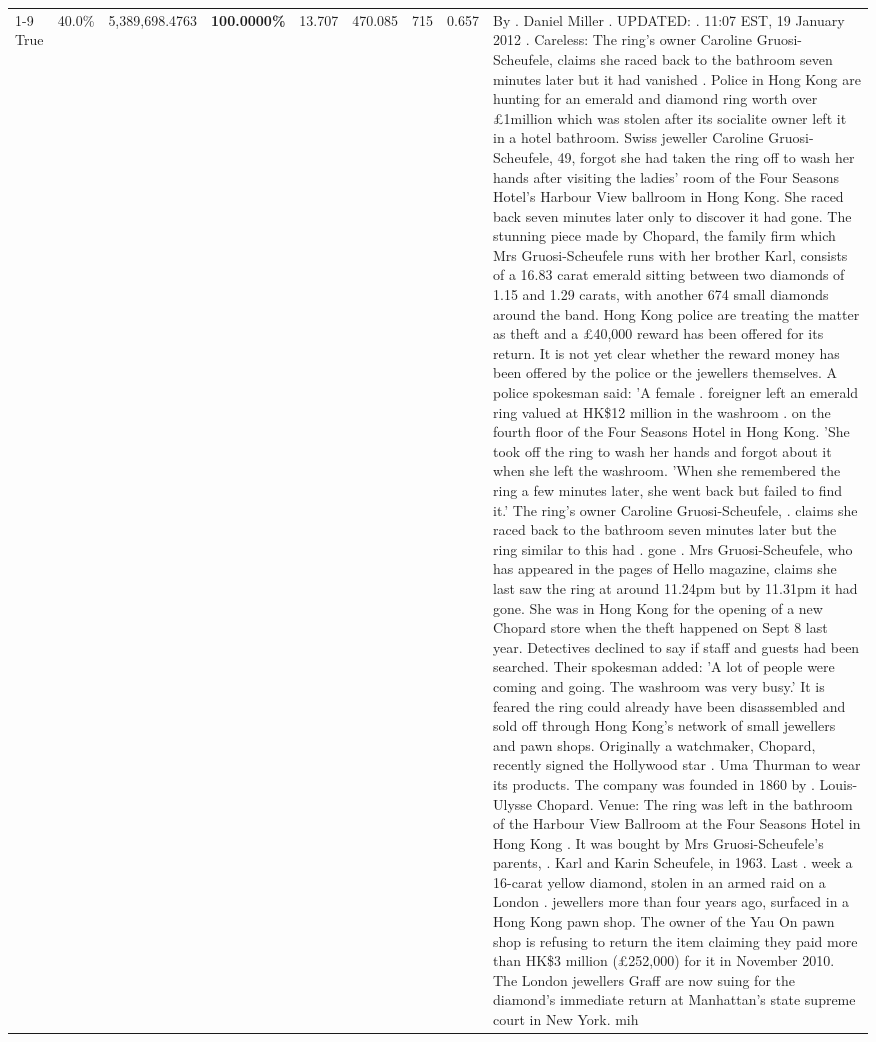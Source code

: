 \begin{table}[H]
\begin{tabular}{lllrlllll}
\cline{1-9}
True & 40.0\% & 5,389,698.4763 & \bfseries \color{red} 100.0000\% & 13.707 & 470.085 & 715 & 0.657 & By . Daniel Miller . UPDATED: . 11:07 EST, 19 January 2012 . Careless: The ring's owner Caroline Gruosi-Scheufele, claims she raced back to the bathroom seven minutes later but it had vanished . Police in Hong Kong are hunting for an emerald and diamond ring worth over £1million which was stolen after its socialite owner left it in a hotel bathroom. Swiss jeweller Caroline Gruosi-Scheufele, 49, forgot she had taken the ring off to wash her hands after visiting the ladies' room of the Four Seasons Hotel's Harbour View ballroom in Hong Kong. She raced back seven minutes later only to discover it had gone. The stunning piece made by Chopard, the family firm which Mrs Gruosi-Scheufele runs with her brother Karl, consists of a 16.83 carat emerald sitting between two diamonds of 1.15 and 1.29 carats, with another 674 small diamonds around the band. Hong Kong police are treating the matter as theft and a £40,000 reward has been offered for its return. It is not yet clear whether the reward money has been offered by the police or the jewellers themselves. A police spokesman said: 'A female . foreigner left an emerald ring valued at HK\$12 million in the washroom . on the fourth floor of the Four Seasons Hotel in Hong Kong. 'She took off the ring to wash her hands and forgot about it when she left the washroom. 'When she remembered the ring a few minutes later, she went back but failed to find it.' The ring's owner Caroline Gruosi-Scheufele, . claims she raced back to the bathroom seven minutes later but the ring similar to this had . gone . Mrs Gruosi-Scheufele, who has appeared in the pages of Hello magazine, claims she last saw the ring at around 11.24pm but by 11.31pm it had gone. She was in Hong Kong for the opening of a new Chopard store when the theft happened on Sept 8 last year. Detectives declined to say if staff and guests had been searched. Their spokesman added: 'A lot of people were coming and going. The washroom was very busy.' It is feared the ring could already have been disassembled and sold off through Hong Kong's network of small jewellers and pawn shops. Originally a watchmaker, Chopard, recently signed the Hollywood star . Uma Thurman to wear its products. The company was founded in 1860 by . Louis-Ulysse Chopard. Venue: The ring was left in the bathroom of the Harbour View Ballroom at the Four Seasons Hotel in Hong Kong . It was bought by Mrs Gruosi-Scheufele's  parents, . Karl and Karin Scheufele, in 1963. Last . week a 16-carat yellow diamond, stolen in an armed raid on a London . jewellers more than four years ago, surfaced in a Hong Kong pawn shop. The owner of the Yau On pawn shop is refusing to return the item claiming they paid more than HK\$3 million (£252,000) for it in November 2010. The London jewellers Graff are now suing for the diamond’s immediate return at Manhattan’s state supreme court in New York. mih \\

\end{tabular}
\end{table}
